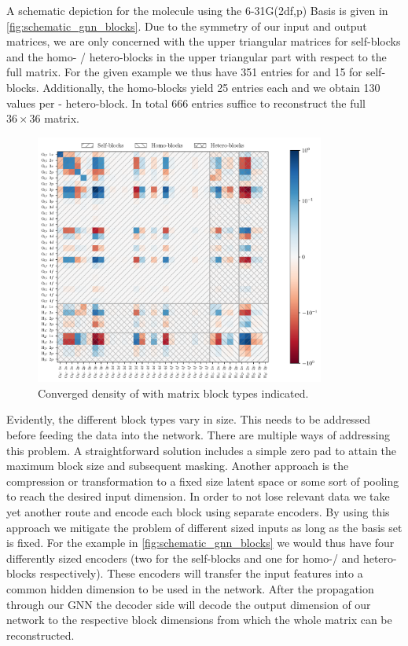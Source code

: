 A schematic depiction for the  molecule using the 6-31G(2df,p) Basis is given in \autoref{fig:schematic_gnn_blocks}. Due to the symmetry of our input and output matrices, we are only concerned with the upper triangular matrices for self-blocks and the homo- / hetero-blocks in the upper triangular part with respect to the full matrix. For the given example we thus have 351 entries for  and 15 for  self-blocks. Additionally, the  homo-blocks yield 25 entries each and we obtain 130 values per - hetero-block. In total 666 entries suffice to reconstruct the full $36 \times 36$ matrix. 
\begin{figure}[H]
    \centering
    \includegraphics[width=0.85\textwidth]{../fig/gnn/schematic_blocks.pdf}
    \caption[Matrix block regions of ]{Converged density of  with matrix block types indicated.}
    \label{fig:schematic_gnn_blocks}
\end{figure}
Evidently, the different block types vary in size. This needs to be addressed before feeding the data into the network. There are multiple ways of addressing this problem. A straightforward solution includes a simple zero pad to attain the maximum block size and subsequent masking. Another approach is the compression or transformation to a fixed size latent space or some sort of pooling to reach the desired input dimension. In order to not lose relevant data we take yet another route and encode each block using separate encoders. By using this approach we mitigate the problem of different sized inputs as long as the basis set is fixed. For the example in \autoref{fig:schematic_gnn_blocks} we would thus have four differently sized encoders (two for the self-blocks and one for homo-/ and hetero-blocks respectively). These encoders will transfer the input features into a common hidden dimension to be used in the network. After the propagation through our GNN the decoder side will decode the output dimension of our network to the respective block dimensions from which the whole matrix can be reconstructed.
